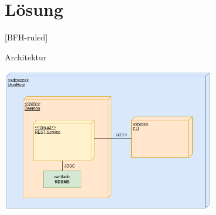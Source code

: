 \documentclass[
    ngerman,%
    authorontitle=true,
]{bfhbeamer}
\begin{document}
    \section{Lösung}\label{sec:loesung}
    [BFH-ruled]
    \frame{\sectionpage}

    \begin{frame}{Architektur}
        \begin{center}
            \includegraphics[width=0.7\textwidth]{assets/DeplDiagram}
        \end{center}
    \end{frame}
\end{document}
